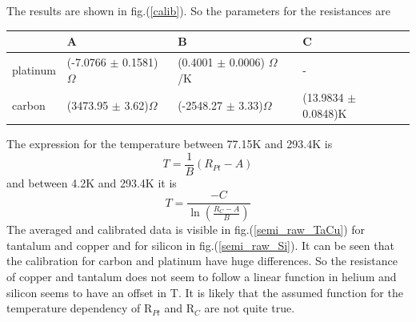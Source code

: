 \documentclass{article}
\begin{document}
The results are shown in fig.(\ref{calib}). So the parameters for the resistances are
    \begin{table}[H]
    \centering
        \begin{tabular}{l|l|l|l}
             & A  & B & C\\\hline
            platinum & (-7.0766 $\pm$ 0.1581)$\Omega$ & (0.4001 $\pm$ 0.0006) $\Omega$/K & - \\\hline
            carbon & (3473.95 $\pm$ 3.62)$\Omega$ & (-2548.27 $\pm$ 3.33)$\Omega$ & (13.9834 $\pm$ 0.0848)K \\
        \end{tabular}
    \end{table}
The expression for the temperature between 77.15K and 293.4K is 
\begin{equation*}
    T = \frac{1}{B} (R_{Pt}-A)
\end{equation*}
and between 4.2K and 293.4K it is
\begin{equation*}
    T = \frac{-C}{\ln(\frac{R_C-A}{B})}
\end{equation*}
The averaged and calibrated data is visible in fig.(\ref{semi_raw_TaCu}) for tantalum and copper and for silicon in fig.(\ref{semi_raw_Si}).
 It can be seen that the calibration for carbon and platinum have huge differences.
 So the resistance of copper and tantalum does not seem to follow a linear function in helium and silicon seems to have an offset in T.
 It is likely that the assumed function for the temperature dependency of R$_{Pt}$ and R$_C$ are not quite true. 
\end{document}
